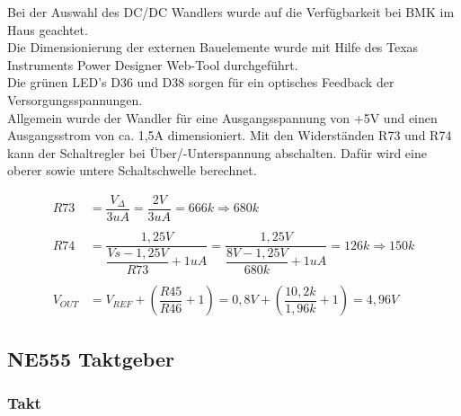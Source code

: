 Bei der Auswahl des DC/DC Wandlers wurde auf die Verfügbarkeit bei BMK im Haus geachtet.
\\
Die Dimensionierung der externen Bauelemente wurde mit Hilfe des \glqq Texas Instruments Power Designer\grqq{} Web-Tool durchgeführt.
\\
Die grünen LED's D36 und D38 sorgen für ein optisches Feedback der Versorgungsspannungen.
\\
Allgemein wurde der Wandler für eine Ausgangsspannung von +5V und einen Ausgangsstrom von ca. 1,5A dimensioniert. Mit den Widerständen R73 und R74 kann der Schaltregler bei Über/-Unterspannung abschalten. Dafür wird eine oberer sowie untere Schaltschwelle berechnet.


\begin{center}
\begin{align*}
	R73 &= \dfrac{V_{\Delta}}{3uA} = \dfrac{2V}{3uA} = 666k  \Rightarrow 680k\\
	\\
	R74 &= \dfrac{1,25V}{\dfrac{Vs - 1,25V}{R73} + 1uA} = \dfrac{1,25V}{\dfrac{8V - 1,25V}{680k} + 1uA} = 126k \Rightarrow 150k	\\
	\\
	V_{OUT}	&= V_{REF} + (\dfrac{R45}{R46} + 1) = 0,8V + (\dfrac{10,2k}{1,96k} + 1) = 4,96V
\end{align*}
\end{center}


\newpage


\subsection{NE555 Taktgeber}

\subsubsection{Takt}

